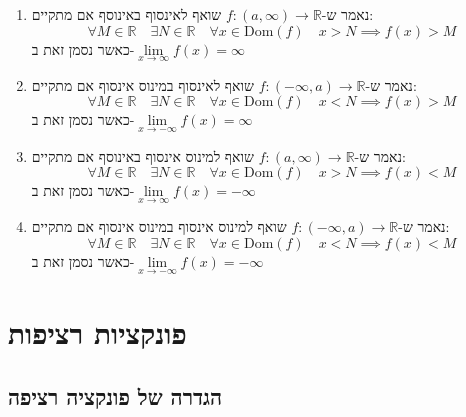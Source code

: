 \documentclass{tstextbook}
\begin{document}
\begin{definition}
  \begin{enumerate}
    \item נאמר ש-\(f:\left( a,\infty \right)\to \mathbb{R}\) שואף לאינסוף באינוסף אם מתקיים: 
$$\forall M  \in \mathbb{R}\quad \exists N \in \mathbb{R}\quad  \forall x \in \mathrm{Dom}(f)\quad  x > N\implies f(x)>M$$
כאשר נסמן זאת ב-\(\underset{ x \to \infty }{\lim }f(x)=\infty\)


    \item נאמר ש-\(f:\left(-\infty,a \right)\to \mathbb{R}\) שואף לאינסוף במינוס אינסוף אם מתקיים: 
$$\forall M  \in \mathbb{R}\quad \exists N \in \mathbb{R}\quad  \forall x \in \mathrm{Dom}(f)\quad  x < N\implies f(x)>M$$
כאשר נסמן זאת ב-\(\underset{ x \to -\infty }{\lim }f(x)=\infty\)


    \item נאמר ש-\(f:\left( a,\infty \right)\to \mathbb{R}\) שואף למינוס אינסוף באינוסף אם מתקיים: 
$$\forall M  \in \mathbb{R}\quad \exists N \in \mathbb{R}\quad  \forall x \in \mathrm{Dom}(f)\quad  x > N\implies f(x)<M$$
כאשר נסמן זאת ב-\(\underset{ x \to \infty }{\lim }f(x)=-\infty\)


    \item נאמר ש-\(f:\left(-\infty,a \right)\to \mathbb{R}\) שואף למינוס אינסוף במינוס אינסוף אם מתקיים: 
$$\forall M  \in \mathbb{R}\quad \exists N \in \mathbb{R}\quad  \forall x \in \mathrm{Dom}(f)\quad  x < N\implies f(x)<M$$
כאשר נסמן זאת ב-\(\underset{ x \to -\infty }{\lim }f(x)=-\infty\)


  \end{enumerate}
\end{definition}
\chapter{פונקציות רציפות}

\section{הגדרה של פונקציה רציפה}
\end{document}
